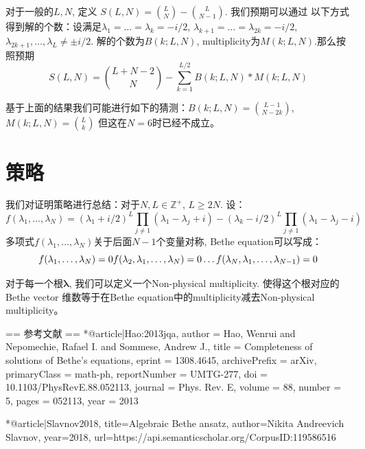 对于一般的$L,N$, 定义
$S(L,N)=\binom{L}{N}-\binom{L}{N-1}$. 我们预期可以通过
以下方式得到解的个数：设满足$\lambda_1=\dots=\lambda_k=-i/2$,
$\lambda_{k+1}=\dots=\lambda_{2k}=-i/2$, $\lambda_{2k+1},\dots,\lambda_{L}\not=\pm i/2$.
解的个数为$B(k;L,N)$, multiplicity为$M(k;L,N)$.那么按照预期
\[S(L,N)=\binom{L+N-2}{N}-\sum_{k=1}^{L/2}B(k;L,N)*M(k;L,N)\]

基于上面的结果我们可能进行如下的猜测：$B(k;L,N)=\binom{L-1}{N-2k}$,$M(k;L,N)=\binom{L}{k}$
但这在$N=6$时已经不成立。

\section{策略}
我们对证明策略进行总结：对于$N,L\in \mathbb{Z}^{+},\,L\ge 2N$. 设：
\[f(\lambda_1,\dots,\lambda_N)={(\lambda_1+i/2)}^L\prod_{j\not=1}{(\lambda_1-\lambda_j+i)}-
{(\lambda_k-i/2)}^L\prod_{j\not=1}{(\lambda_1-\lambda_j-i)}\]
多项式$f(\lambda_1,\dots,\lambda_N)$关于后面$N-1$个变量对称, Bethe equation可以写成：
\[
    f(\lambda_1,\dots,\lambda_N)=0\\
    f(\lambda_2,\lambda_1,\dots,\lambda_N)=0\\
    \dots\\
    f(\lambda_N,\lambda_1,\dots,\lambda_{N-1})=0
\]

对于每一个根$\bm{\lambda}$, 我们可以定义一个Non-physical multiplicity. 
使得这个根对应的 Bethe vector 维数等于在Bethe equation中的multiplicity减去Non-physical multiplicity。


== 参考文献 ==
*{{@article|Hao:2013jqa,
    author = Hao, Wenrui and Nepomechie, Rafael I. and Sommese, Andrew J.,
    title = {Completeness of solutions of Bethe's equations},
    eprint = 1308.4645,
    archivePrefix = arXiv,
    primaryClass = math-ph,
    reportNumber = UMTG-277,
    doi = 10.1103/PhysRevE.88.052113,
    journal = Phys. Rev. E,
    volume = 88,
    number = 5,
    pages = 052113,
    year = 2013
}}

*{{@article|Slavnov2018,
  title={Algebraic Bethe ansatz},
  author={Nikita Andreevich Slavnov},
  year={2018},
  url={https://api.semanticscholar.org/CorpusID:119586516}
}}
